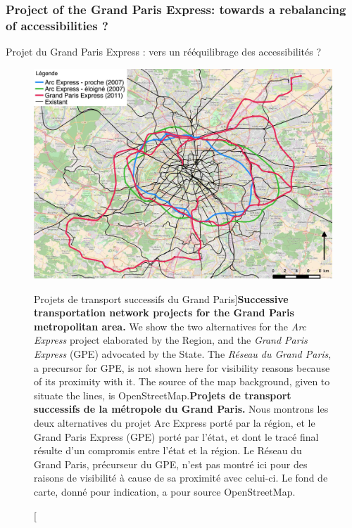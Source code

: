 




\subsubsection{Project of the Grand Paris Express: towards a rebalancing of accessibilities ?}{Projet du Grand Paris Express : vers un rééquilibrage des accessibilités ?}






\begin{figure}%
\includegraphics[width=\linewidth]{Figures/Final/1-2-1-fig-casestudies-projects.jpg}
\caption[Successive transportation projects for Greater Paris][Projets de transport successifs du Grand Paris]{\textbf{Successive transportation network projects for the Grand Paris metropolitan area.} We show the two alternatives for the \emph{Arc Express} project elaborated by the Region, and the \emph{Grand Paris Express} (GPE) advocated by the State. The \emph{Réseau du Grand Paris}, a precursor for GPE, is not shown here for visibility reasons because of its proximity with it. The source of the map background, given to situate the lines, is OpenStreetMap.\label{fig:casestudies:projects}}{\textbf{Projets de transport successifs de la métropole du Grand Paris.} Nous montrons les deux alternatives du projet Arc Express porté par la région, et le Grand Paris Express (GPE) porté par l'état, et dont le tracé final résulte d'un compromis entre l'état et la région. Le Réseau du Grand Paris, précurseur du GPE, n'est pas montré ici pour des raisons de visibilité à cause de sa proximité avec celui-ci. Le fond de carte, donné pour indication, a pour source OpenStreetMap.\label{fig:casestudies:projects}}
\end{figure}



